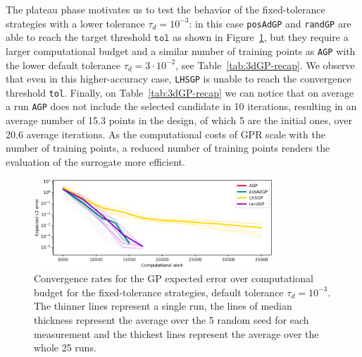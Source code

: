 The plateau phase motivates us to test the behavior of the fixed-tolerance strategies with a lower tolerance $\tau_d = 10^{-3}$: in this case \texttt{posAdGP} and \texttt{randGP} are able to reach the target threshold $\texttt{tol}$ as shown in Figure~\ref{fig:3dGP-other}, but they require a larger computational budget and a similar number of training points as \texttt{AGP} with the lower default tolerance $\tau_d =  3\cdot 10^{-2}$, see Table~\ref{tab:3dGP-recap}.
We observe that even in this higher-accuracy case, \texttt{LHSGP} is unable to reach the convergence threshold \texttt{tol}.
Finally, on Table~\ref{tab:3dGP-recap} we can notice that on average a run \texttt{AGP} does not include the selected candidate in 10 iterations, resulting in an average number of 15.3 points in the design, of which 5 are the initial ones, over 20.6 average iterations.
As the computational costs of GPR scale with the number of training points, a reduced number of training points renders the evaluation of the surrogate more efficient.

\begin{figure}[H]
\begin{center}
    \includegraphics[width=0.8\textwidth]{results/pictures/d3/config_dtol0.001/GP_res.png}
\end{center}
\caption{Convergence rates for the GP expected error over computational budget for the fixed-tolerance strategies, default tolerance $\tau_d = 10^{-3}$. The thinner lines represent a single run, the lines of median thickness represent the average over the 5 random seed for each measurement and the thickest lines represent the average over the whole 25 runs.}
\label{fig:3dGP-other}
\end{figure}

